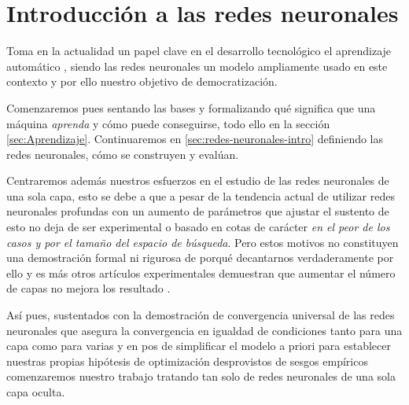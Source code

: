
\chapter{Introducción a las redes neuronales} 

Toma en la actualidad un papel clave en el desarrollo tecnológico el aprendizaje automático
\cite{importancia-arte-aprendizaje-automatico}, siendo 
las redes neuronales un modelo ampliamente usado en este contexto y por ello 
nuestro objetivo de democratización. 

Comenzaremos pues  sentando las bases y 
formalizando  
qué significa 
que una máquina \textit{aprenda}  y cómo puede conseguirse, 
todo ello en la sección \ref{sec:Aprendizaje}.
Continuaremos en \ref{sec:redes-neuronales-intro} 
definiendo las redes neuronales, cómo se construyen y evalúan. 

Centraremos además nuestros esfuerzos en el estudio de las redes neuronales de una sola capa, 
esto se debe a que a pesar de la tendencia actual de utilizar redes neuronales profundas con 
un aumento de parámetros que ajustar 
\cite{a-universal-law-of-Robustness} \cite{CHAI2021100134} el sustento de esto no deja de ser experimental 
o basado en cotas de carácter \textit{en el peor de los casos y por el tamaño del espacio de búsqueda}.
Pero estos motivos no constituyen una demostración formal ni rigurosa de porqué decantarnos verdaderamente por 
ello y es más otros artículos experimentales demuestran que aumentar el número de capas no mejora los resultado 
\cite{DBLP:conf/iwann/Linan-Villafranca21}. 

Así pues, sustentados con la demostración de convergencia universal \cite{HORNIK1989359}
de las redes neuronales que asegura la convergencia en igualdad de condiciones 
tanto para una capa como para varias
y en pos de simplificar el modelo a priori 
para establecer nuestras propias hipótesis de optimización desprovistos
de sesgos empíricos comenzaremos nuestro trabajo tratando tan solo de redes neuronales de una sola capa oculta.